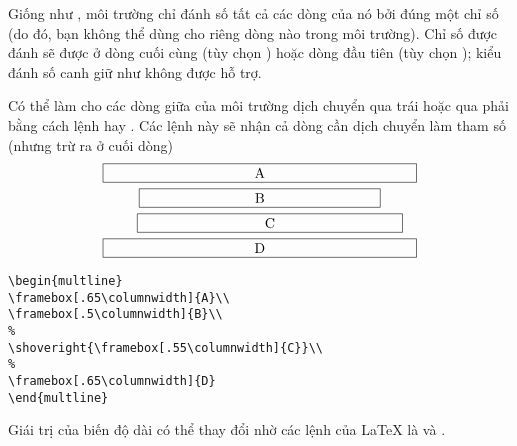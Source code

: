 \medskip
Giống như , môi trường  chỉ đánh số tất cả
các dòng của nó bởi đúng một chỉ số (do đó, bạn không thể dùng 
cho riêng dòng nào trong môi trường). Chỉ số được đánh sẽ được ở dòng
cuối cùng (tùy chọn ) hoặc dòng đầu tiên (tùy chọn );
kiểu đánh số canh giữ như  không được hỗ trợ.

\medskip
Có thể làm cho các dòng giữa của môi trường dịch chuyển qua trái hoặc
qua phải bằng cách lệnh  hay .
Các lệnh này sẽ nhận cả dòng cần dịch chuyển làm tham số
(nhưng trừ ra \cn{\\} ở cuối dòng)
\begin{multline}
\framebox[.65\columnwidth]{A}\\
\framebox[.5\columnwidth]{B}\\
\shoveright{\framebox[.55\columnwidth]{C}}\\
\framebox[.65\columnwidth]{D}
\end{multline}
\begin{verbatim}
\begin{multline}
\framebox[.65\columnwidth]{A}\\
\framebox[.5\columnwidth]{B}\\
%
\shoveright{\framebox[.55\columnwidth]{C}}\\
%
\framebox[.65\columnwidth]{D}
\end{multline}
\end{verbatim}

Giái trị của biến độ dài  có thể thay đổi nhờ các
lệnh của \LaTeX{} là  và .

